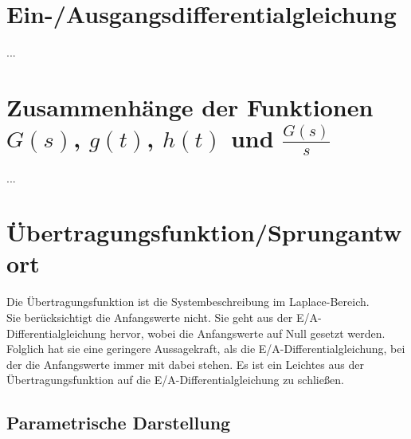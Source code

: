 \documentclass[
  ngerman
  ,12pt
  ,pdftex
]{article}
\begin{document}



\section{Ein-/Ausgangsdifferentialgleichung}
...

\section{Zusammenhänge der Funktionen $G(s)$, $g(t)$, $h(t)$ und $\frac{G(s)}{s}$}
...

\section{Übertragungsfunktion/Sprungantwort}
Die Übertragungsfunktion ist die Systembeschreibung im Laplace-Bereich.\\
Sie berücksichtigt die Anfangswerte nicht. Sie geht aus der E/A-Differential\-gleichung hervor, wobei die Anfangswerte auf Null gesetzt werden. Folglich hat sie eine geringere Aussagekraft, als die E/A-Differentialgleichung, bei der die Anfangswerte immer mit dabei stehen. Es ist ein Leichtes aus der Übertragungsfunktion auf die E/A-Differentialgleichung zu schließen.
\subsection{Parametrische Darstellung} %
\end{document}
